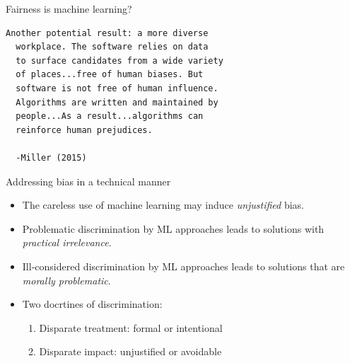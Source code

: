 \documentclass[12pt,t]{beamer}
\begin{document}

\begin{frame}[fragile,c]{Fairness is machine learning?}

\begin{center}
\begin{minipage}[c]{11.25cm}
\begin{semiverbatim}
\lstset{basicstyle=\normalsize}
\begin{lstlisting}[linewidth=11.25cm]
  Another potential result: a more diverse
  workplace. The software relies on data
  to surface candidates from a wide variety
  of places...free of human biases. But
  software is not free of human influence.
  Algorithms are written and maintained by
  people...As a result...algorithms can
  reinforce human prejudices.

  -Miller (2015)
\end{lstlisting}
\end{semiverbatim}
\end{minipage}
\end{center}


\end{frame}


\begin{frame}[c]{Addressing bias in a technical manner}

\begin{center}
\begin{itemize}
  \itemsep12pt
  \item The careless use of machine learning may induce \textit{unjustified}
    bias.
  \item Problematic discrimination by ML approaches leads to solutions with
    \textit{practical irrelevance}.
  \item Ill-considered discrimination by ML approaches leads to solutions that
    are \textit{morally problematic}.
  \item Two docrtines of discrimination:
    \begin{enumerate}
      \item Disparate treatment: formal or intentional
      \item Disparate impact: unjustified or avoidable
    \end{enumerate}
\end{itemize}
\end{center}


\end{frame}
\end{document}
